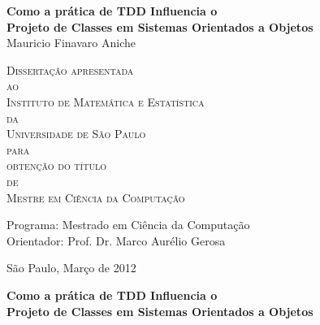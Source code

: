 \documentclass[11pt,openany,twoside,a4paper]{book}
\begin{document}
\frontmatter 
\fancyhead[RO]{{\footnotesize\rightmark}\hspace{2em}\thepage}
\setcounter{tocdepth}{2}
\fancyhead[LE]{\thepage\hspace{2em}\footnotesize{\leftmark}}
\fancyhead[RE,LO]{}
\fancyhead[RO]{{\footnotesize\rightmark}\hspace{2em}\thepage}

\onehalfspacing  %

\thispagestyle{empty}
\begin{center}
    \vspace*{2.3cm}
    \textbf{\Large{Como a prática de TDD Influencia o \\Projeto de Classes em Sistemas Orientados a Objetos}}\\
    
    \vspace*{1.2cm}
    \Large{Mauricio Finavaro Aniche}
    
    \vskip 2cm
    \textsc{
    Dissertação apresentada\\[-0.25cm] 
    ao\\[-0.25cm]
    Instituto de Matemática e Estatística\\[-0.25cm]
    da\\[-0.25cm]
    Universidade de São Paulo\\[-0.25cm]
    para\\[-0.25cm]
    obtenção do título\\[-0.25cm]
    de\\[-0.25cm]
    Mestre em Ciência da Computação}
    
    \vskip 1.5cm
    Programa: Mestrado em Ciência da Computação\\
    Orientador: Prof. Dr. Marco Aurélio Gerosa

   	\vskip 1.5cm
    \normalsize{São Paulo, Março de 2012}
\end{center}

\newpage
\thispagestyle{empty}
    \begin{center}
        \vspace*{2.3 cm}
        \textbf{\Large{Como a prática de TDD Influencia o \\Projeto de Classes em Sistemas Orientados a Objetos}}\\
        \vspace*{2 cm}
    \end{center}
\end{document}
